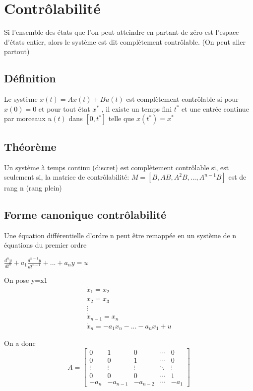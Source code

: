\documentclass[resume]{subfiles}
\begin{document}
\section{Contrôlabilité}

Si l'ensemble des états que l'on peut atteindre en partant de zéro est l'espace d'états entier, alors le système est dit complètement contrôlable. (On peut aller partout)

\subsection{Définition}

Le système $\dot{x}(t) = Ax(t)+Bu(t)$ est complètement contrôlable si pour $x(0)=0$ et pour tout état $x^*$ , il existe un temps fini $t^*$ et une entrée continue par morceaux $u(t)$ dans $[0,t^*]$ telle que $x(t^*)=x^*$ 

\subsection{Théorème}

Un système à temps continu (discret) est complètement contrôlable si, est seulement si, la matrice de contrôlabilité:
$M = [B, AB, A^2B,..., A^{n-1}B]$ est de rang n  (rang plein)

\subsection{Forme canonique contrôlabilité}

Une équation différentielle d'ordre n peut être remappée en un système de n équations du premier ordre

$\frac{d^ny}{dt^n} + a_1\frac{d^{n-1}y}{dt^{n-1}}+...+ a_ny=u$ 

On pose y=x1
\begin{align*}
\dot{x}_1 = x_2\\
\dot{x}_2 = x_3\\
\vdots\\
\dot{x}_{n-1} = x_n\\
\dot{x}_n = -a_1x_n -...- a_nx_1+u
\end{align*}

On a donc 
$$
A=\begin{bmatrix}
0 & 1 & 0 & \cdots & 0 \\
0 & 0 & 1 & \cdots & 0 \\
\vdots & \vdots & \vdots& \ddots & \vdots\\
0 & 0 & 0 & \cdots & 1 \\
-a_n & -a_{n-1}& -a_{n-2} &\cdots& -a_{1}
\end{bmatrix}$$
\end{document}
